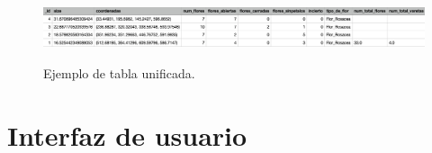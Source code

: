 \begin{figure}[ht]
	\centering
	\includegraphics[width= 14cm, height= 2cm]{./Figures/Tabla3.png}
	\caption{Ejemplo de tabla unificada.}
	\label{fig:TablaResultados3}
\end{figure}

\newpage
\section{Interfaz de usuario}

%




